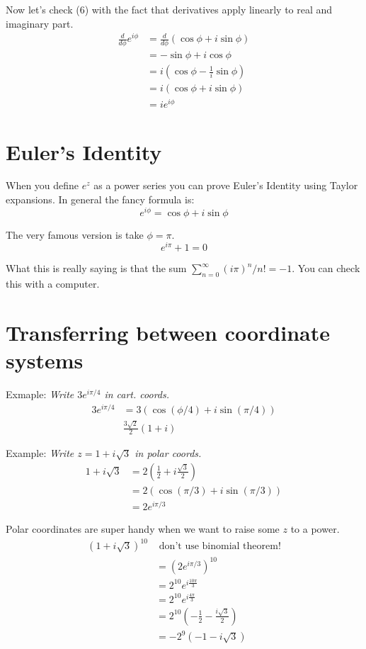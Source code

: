 \documentclass[a4paper, 11pt]{article}
\begin{document}
\noindent Now let's check (6) with the fact that derivatives apply linearly to real and imaginary part. 
	\begin{align*}
		\frac{d}{d\phi}e^{i\phi} &= \frac{d}{d\phi}(\cos\phi + i\sin\phi) \\ 
			&= -\sin\phi + i\cos\phi \\ 
			&= i(\cos\phi-\frac{1}{i}\sin\phi) \\ 
			&= i(\cos\phi + i\sin\phi) \\ 
			&= ie^{i\phi}
	\end{align*}

\section*{Euler's Identity}
When you define $e^z$ as a power series you can prove Euler's Identity using Taylor expansions. In general the fancy formula is:
	\begin{equation}
		e^{i\phi}= \cos\phi + i\sin\phi
	\end{equation}
	
\noindent The very famous version is take $\phi = \pi$. 
	\begin{equation}
		e^{i\pi}+1 = 0
	\end{equation}

\noindent What this is really saying is that the sum $\sum_{n=0}^\infty (i\pi)^n/n! = -1$. You can check this with a computer. 

\section*{Transferring between coordinate systems}
Exmaple: \textit{Write $3e^{i\pi/4}$ in cart. coords.}
	\begin{align*}
		3e^{i\pi/4} &= 3(\cos(\phi/4)+i\sin(\pi/4)) \\ 
			& \frac{3\sqrt{2}}{2}(1+i)
	\end{align*}
	
\noindent Example: \textit{Write $z=1+i\sqrt{3}$ in polar coords.}
	\begin{align*}
		1+i\sqrt{3} &= 2(\frac{1}{2}+i\frac{\sqrt{3}}{2}) \\ 
			&= 2(\cos(\pi/3)+i\sin(\pi/3)) \\
			&= 2e^{i\pi/3}
	\end{align*}

\noindent Polar coordinates are super handy when we want to raise some $z$ to a power. 
	\begin{align*}
		(1+i\sqrt{3})^{10} &\text{ don't use binomial theorem!} \\ 
			&= (2e^{i\pi/3})^10 \\ 
			&= 2^{10}e^{i\frac{10\pi}{3}} \\ 
			&= 2^{10}e^{i\frac{4\pi}{3}} \\ 
			&= 2^{10}(-\frac{1}{2}-\frac{i\sqrt{3}}{2}) \\ 
			&= -2^9(-1-i\sqrt{3})
	\end{align*}
\end{document}

